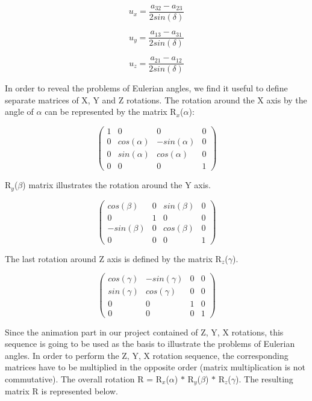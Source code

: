 \documentclass[times, 10pt,twocolumn]{article}
\begin{document}
\begin{equation}
\label{eq_three1}
u_{x} = \frac{a_{32} - a_{23}}{2sin(\delta)}
\end{equation}

\begin{equation}
\label{eq_three2}
u_{y} = \frac{a_{13} - a_{31}}{2sin(\delta)}
\end{equation}

\begin{equation}
\label{eq_three3}
u_{z} = \frac{a_{21} - a_{12}}{2sin(\delta)}
\end{equation}

In order to reveal the problems of Eulerian angles, we find it useful to define separate matrices of X, Y and Z rotations.
The rotation around the X axis by the angle of $\alpha$ can be represented by the matrix R$_{x}$($\alpha$):

\[ \left( \begin{array}{cccc}
1 & 0 & 0 & 0 \\
0 & cos(\alpha) & -sin(\alpha) & 0 \\
0 & sin(\alpha) & cos(\alpha) & 0 \\
0 & 0 & 0 & 1
\end{array} \right)\]

R$_{y}$($\beta$) matrix illustrates the rotation around the Y axis.

\[ \left( \begin{array}{cccc}
cos(\beta) & 0 & sin(\beta) & 0 \\
0 & 1 & 0 & 0 \\
-sin(\beta) & 0 & cos(\beta) & 0 \\
0 & 0 & 0 & 1
\end{array} \right)\]

The last rotation around Z axis is defined by the matrix R$_{z}$($\gamma$).

\[ \left( \begin{array}{cccc}
cos(\gamma) & -sin(\gamma) & 0 & 0 \\
sin(\gamma) & cos(\gamma) & 0 & 0 \\
0 & 0 & 1 & 0 \\
0 & 0 & 0 & 1
\end{array} \right)\]

Since the animation part in our project contained of Z, Y, X rotations, this sequence is going to be used as the basis to illustrate the problems of Eulerian angles. In order to perform the Z, Y, X rotation sequence, the corresponding matrices have to be multiplied in the opposite order (matrix multiplication is not commutative). The overall rotation R = R$_{x}$($\alpha$) $\ast$ R$_{y}$($\beta$) $\ast$ R$_{z}$($\gamma$). The resulting matrix R is represented below.
\end{document}

